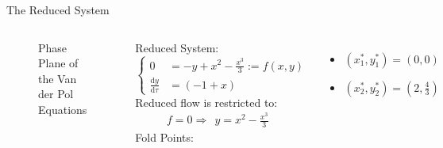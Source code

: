 \documentclass[11pt]{beamer}
\newcommand{\dif}{\mathrm{d}}
\begin{document}
\begin{frame}{The Reduced System}
\begin{columns}
\begin{figure}
    \centering
{}
    \caption{Phase Plane of the Van der Pol Equations}
\end{figure}
Reduced System:
\begin{equation*} 
        \begin{cases}
        0 &= -y + x^2 - \frac{x^3}{3} := f(x,y)\\ 
        \frac{\dif y}{\dif \tau}&= (-1+x)
        \end{cases}
        \end{equation*}
\newline
Reduced flow is restricted to:
\begin{align*}
&f=0 \Rightarrow \ \ y = x^2 - \frac{x^3}{3} \ \ \ \ \ \ \
\end{align*}
\newline
\newline
Fold Points:
\begin{itemize}
\item$(x_1^*,y_1^*)= (0,0) $

\item$(x_2^*,y_2^*)=(2,\frac{4}{3})$
\end{itemize}


\end{columns}
\end{frame}
\end{document}
